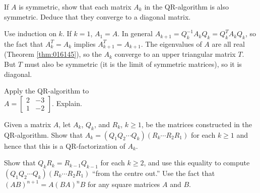 \documentclass{ximera}
\begin{document}
\begin{problem}\label{prob:QR-symmetric}
If $A$ is symmetric, show that each matrix $A_{k}$ in the QR-algorithm is also symmetric. Deduce that they converge to a diagonal matrix.

\begin{hint}
Use induction on $k$. If $k = 1$, $A_{1} = A$. In general $A_{k+1} = Q_{k}^{-1}A_{k}Q_{k} = Q_{k}^{T}A_{k}Q_{k}$, so the fact that $A_{k}^{T} = A_{k}$ implies $A_{k+1}^{T} = A_{k+1}$. The eigenvalues of $A$ are all real (Theorem \ref{thm:016145}), so the $A_{k}$ converge to an upper triangular matrix $T$. But $T$ must also be symmetric (it is the limit of symmetric matrices), so it is diagonal.
\end{hint}
\end{problem}

\begin{problem}\label{QR-special-2x2}
Apply the QR-algorithm to \\ $A = \left[ \begin{array}{rr}
2 & -3 \\
1 & -2
\end{array}\right]$. Explain.
\end{problem}

\begin{problem}\label{prob:analyzeQRalgorithm}
Given a matrix $A$, let $A_{k}$, $Q_{k}$, and $R_{k}$, $k \geq 1$, be the matrices constructed in the QR-algorithm. Show that $A_{k} = (Q_{1}Q_{2} \cdots Q_{k})(R_{k} \cdots R_{2}R_{1})$ for each $k \geq 1$ and hence that this is a QR-factorization of $A_{k}$. 
\begin{hint}
Show that $Q_{k}R_{k} = R_{k-1}Q_{k-1}$ for each $k \geq 2$, and use this equality to compute $(Q_{1}Q_{2} \cdots Q_{k})(R_{k} \cdots R_{2}R_{1})$ ``from the centre out.'' Use the fact that $(AB)^{n+1} = A(BA)^{n}B$ for any square matrices $A$ and $B$.
\end{hint}
\end{problem}
\end{document}
